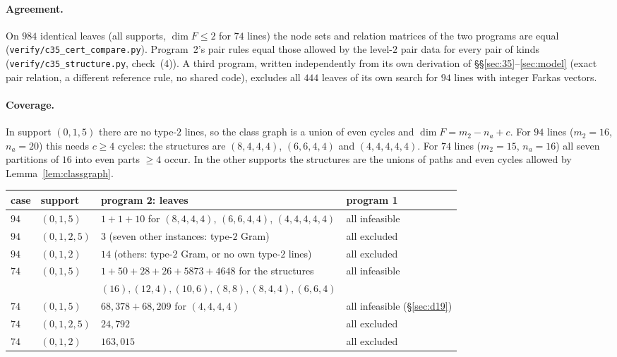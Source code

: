 \documentclass[11pt]{article}
\theoremstyle{definition}
\begin{document}
\paragraph{Agreement.} On $984$ identical leaves (all supports, $\dim F\le2$ for $74$ lines) the node sets
and relation matrices of the two programs are equal (\texttt{verify/c35\_cert\_compare.py}). Program~2's
pair rules equal those allowed by the level-$2$ pair data for every pair of kinds
(\texttt{verify/c35\_structure.py}, check~(4)). A third program, written independently
from its own derivation of \S\S\ref{sec:35}--\ref{sec:model} (exact pair relation, a different
reference rule, no shared code), excludes all $444$ leaves of its own search for $94$ lines with
integer Farkas vectors.

\paragraph{Coverage.} In support $(0,1,5)$ there are no type-$2$ lines, so the class graph is a union of
even cycles and $\dim F=m_2-n_a+c$. For $94$ lines ($m_2=16$, $n_a=20$) this needs $c\ge4$ cycles: the
structures are $(8,4,4,4)$, $(6,6,4,4)$ and $(4,4,4,4,4)$. For $74$ lines ($m_2=15$, $n_a=16$) all seven
partitions of $16$ into even parts $\ge4$ occur. In the other supports the structures are the unions of
paths and even cycles allowed by Lemma~\ref{lem:classgraph}.

\begin{center}
\small
\begin{tabular}{llll}
\toprule
case & support & program 2: leaves & program 1\\
\midrule
$94$ & $(0,1,5)$ & $1+1+10$ for $(8,4,4,4)$, $(6,6,4,4)$, $(4,4,4,4,4)$ & all infeasible\\
$94$ & $(0,1,2,5)$ & $3$ (seven other instances: type-$2$ Gram) & all excluded\\
$94$ & $(0,1,2)$ & $14$ (others: type-$2$ Gram, or no own type-$2$ lines) & all excluded\\
$74$ & $(0,1,5)$ & $1+50+28+26+5873+4648$ for the structures & all infeasible\\
& & $(16),(12,4),(10,6),(8,8),(8,4,4),(6,6,4)$ & \\
$74$ & $(0,1,5)$ & $68{,}378+68{,}209$ for $(4,4,4,4)$ & all infeasible (\S\ref{sec:d19})\\
$74$ & $(0,1,2,5)$ & $24{,}792$ & all excluded\\
$74$ & $(0,1,2)$ & $163{,}015$ & all excluded\\
\bottomrule
\end{tabular}
\end{center}
\end{document}
